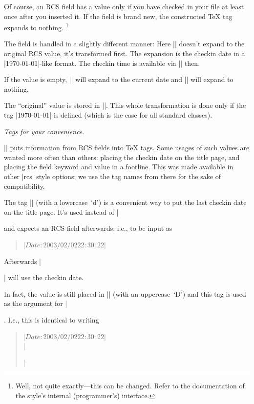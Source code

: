 Of course, an RCS field has a value only if you have checked in your
file at least once after you inserted it. If the field is brand new,
the constructed \TeX{} tag expands to nothing.%
  \footnote{Well, not quite exactly---this can be changed. Refer to
    the documentation of the style's internal (programmer's) interface.}


\sect The \Date{} field is handled in a slightly different manner: Here
|\RCSDate| doesn't expand to the original RCS value, it's transformed
first. The expansion is the checkin date in a |\today|-like format.
The checkin time is available via |\RCSTime| then.

If the \Date{} value is empty, |\RCSDate| will expand to the
current date and |\RCSTime| will expand to nothing.

The ``original'' \Date{} value is stored in |\RCSRawDate|. This whole
transformation is done only if the tag |\today| is defined (which is
the case for all standard classes).



\sect \textsl{Tags for your convenience}.

\medskip

\noindent |\RCS| puts information from RCS fields into \TeX{} tags.
Some usages of such values are wanted more often than others: placing
the checkin date on the title page, and placing the field keyword and
value in a footline. This was made available in other |rcs| style options;
we use the tag names from there for the sake of compatibility.


\sect The tag |\RCSdate| (with a lowercase~`d') is a convenient
way to put the last checkin date on the title page. It's used instead
of |\date| and expects an RCS \Date{} field afterwards; i.e., to be
input as
%
\begin{quote}
  |\RCSdate $Date: 2003/02/02 22:30:22 $|
\end{quote}
%
Afterwards |\maketitle| will use the checkin date.

In fact, the \Date{} value is still placed in |\RCSDate| (with an
uppercase~`D') and this tag is used as the argument for |\date|.
I.e., this is identical to writing
%
\begin{quote}
  |\RCS $Date: 2003/02/02 22:30:22 $|\\
  |\date{\RCSDate}|
\end{quote}


